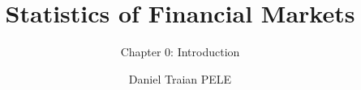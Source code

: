 \title[Statistics of Financial Markets]{Statistics of Financial Markets}
\subtitle{Chapter 0: Introduction}
\author[D.T. Pele]{Daniel Traian PELE}
\date{}

\providecommand{\sfmapplink}[3]{\hypertarget{#2}{}\hyperlink{#1}{\beamergotobutton{#3}}}  %
\providecommand{\sfmappback}[2]{\begin{tikzpicture}[remember picture,overlay]\node[anchor=south east] at ([xshift=-3mm,yshift=7mm]current page.south east){\hyperlink{#1}{\beamerreturnbutton{#2}}};\end{tikzpicture}}  %
\providecommand{\sfmchlink}[2]{\href{#1}{#2}}  %
\providecommand{\sfmchlinkt}[2]{\href{#1}{\usebeamercolor[fg]{frametitle}#2}}  %


